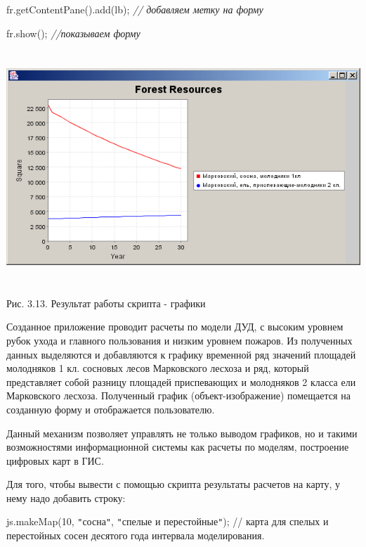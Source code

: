 \documentclass{article}
\begin{document}
fr.getContentPane().add(lb);    \textit{// добавляем метку на форму}

fr.show();       \textit{//показываем форму}

\includegraphics[width=449pt, height=249pt, keepaspectratio=true]{asyaDisser9_3-fig010.png}

\begin{center}
Рис. 3.13. Результат работы скрипта - графики
\end{center}

Созданное приложение проводит расчеты по модели 
ДУД, с высоким уровнем рубок ухода и главного 
пользования и низким уровнем пожаров. Из полученных 
данных выделяются и добавляются к графику временной 
ряд значений площадей молодняков 1 кл. сосновых 
лесов Марковского лесхоза и ряд, который представляет 
собой разницу площадей приспевающих и молодняков 
2 класса ели Марковского лесхоза. Полученный 
график (объект-изображение) помещается на созданную 
форму и отображается пользователю.

Данный механизм позволяет управлять не только 
выводом графиков, но и такими возможностями 
информационной системы как расчеты по моделям, 
построение цифровых карт в ГИС.

Для того, чтобы вывести с помощью скрипта результаты 
расчетов на карту, у нему надо добавить строку:

js.makeMap(10, \texttt{"}сосна\texttt{"}, \texttt{"}спелые и перестойные\texttt{"}); 
 // карта для спелых и перестойных сосен десятого 
года интервала моделирования.
\end{document}
